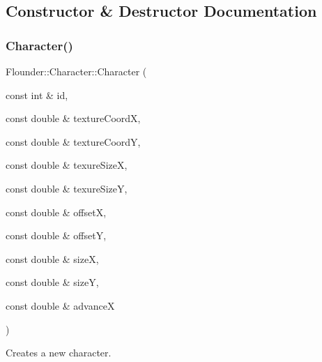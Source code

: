 \subsection{Constructor \& Destructor Documentation}
\mbox{\label{class_flounder_1_1_character_a624a59b50c5f4ad99ed5c29b5acbea6f}} 
\subsubsection{\texorpdfstring{Character()}{Character()}}
{\footnotesize\ttfamily Flounder\+::\+Character\+::\+Character (\begin{DoxyParamCaption}\item[{const int \&}]{id,  }\item[{const double \&}]{texture\+CoordX,  }\item[{const double \&}]{texture\+CoordY,  }\item[{const double \&}]{texure\+SizeX,  }\item[{const double \&}]{texure\+SizeY,  }\item[{const double \&}]{offsetX,  }\item[{const double \&}]{offsetY,  }\item[{const double \&}]{sizeX,  }\item[{const double \&}]{sizeY,  }\item[{const double \&}]{advanceX }\end{DoxyParamCaption})}



Creates a new character. 


